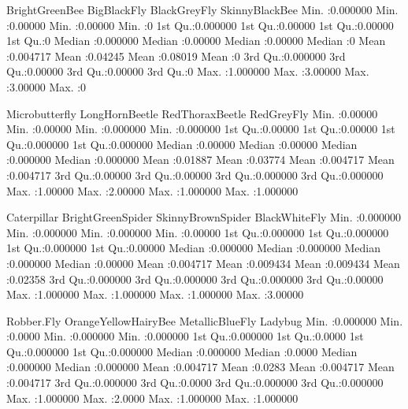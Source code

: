 \documentclass[11pt]{amsart}
\begin{document}
\begin{Schunk}
\begin{Soutput}
 BrightGreenBee      BigBlackFly       BlackGreyFly     SkinnyBlackBee
 Min.   :0.000000   Min.   :0.00000   Min.   :0.00000   Min.   :0     
 1st Qu.:0.000000   1st Qu.:0.00000   1st Qu.:0.00000   1st Qu.:0     
 Median :0.000000   Median :0.00000   Median :0.00000   Median :0     
 Mean   :0.004717   Mean   :0.04245   Mean   :0.08019   Mean   :0     
 3rd Qu.:0.000000   3rd Qu.:0.00000   3rd Qu.:0.00000   3rd Qu.:0     
 Max.   :1.000000   Max.   :3.00000   Max.   :3.00000   Max.   :0     
                                                                      
 Microbutterfly    LongHornBeetle    RedThoraxBeetle      RedGreyFly      
 Min.   :0.00000   Min.   :0.00000   Min.   :0.000000   Min.   :0.000000  
 1st Qu.:0.00000   1st Qu.:0.00000   1st Qu.:0.000000   1st Qu.:0.000000  
 Median :0.00000   Median :0.00000   Median :0.000000   Median :0.000000  
 Mean   :0.01887   Mean   :0.03774   Mean   :0.004717   Mean   :0.004717  
 3rd Qu.:0.00000   3rd Qu.:0.00000   3rd Qu.:0.000000   3rd Qu.:0.000000  
 Max.   :1.00000   Max.   :2.00000   Max.   :1.000000   Max.   :1.000000  
                                                                          
  Caterpillar       BrightGreenSpider  SkinnyBrownSpider  BlackWhiteFly    
 Min.   :0.000000   Min.   :0.000000   Min.   :0.000000   Min.   :0.00000  
 1st Qu.:0.000000   1st Qu.:0.000000   1st Qu.:0.000000   1st Qu.:0.00000  
 Median :0.000000   Median :0.000000   Median :0.000000   Median :0.00000  
 Mean   :0.004717   Mean   :0.009434   Mean   :0.009434   Mean   :0.02358  
 3rd Qu.:0.000000   3rd Qu.:0.000000   3rd Qu.:0.000000   3rd Qu.:0.00000  
 Max.   :1.000000   Max.   :1.000000   Max.   :1.000000   Max.   :3.00000  
                                                                           
   Robber.Fly       OrangeYellowHairyBee MetallicBlueFly       Ladybug        
 Min.   :0.000000   Min.   :0.0000       Min.   :0.000000   Min.   :0.000000  
 1st Qu.:0.000000   1st Qu.:0.0000       1st Qu.:0.000000   1st Qu.:0.000000  
 Median :0.000000   Median :0.0000       Median :0.000000   Median :0.000000  
 Mean   :0.004717   Mean   :0.0283       Mean   :0.004717   Mean   :0.004717  
 3rd Qu.:0.000000   3rd Qu.:0.0000       3rd Qu.:0.000000   3rd Qu.:0.000000  
 Max.   :1.000000   Max.   :2.0000       Max.   :1.000000   Max.   :1.000000  
                                                                              

\end{Soutput}
\end{Schunk}
\end{document}
